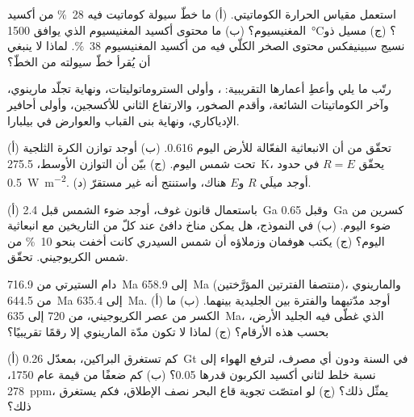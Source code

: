 \begin{exercise}[$\star$]\label{exo:b2:precambrian-earth:3}
استعمل مقياس الحرارة الكوماتيتي. (أ) ما خطّ سيولة كوماتيت فيه
\qty{28}{\percent} من أكسيد المغنيسيوم؟ (ب) ما محتوى أكسيد المغنيسيوم الذي يوافق \qty{1500}{\celsius}؟ (ج) مسيل
ذو نسيج سبينيفكس محتوى الصخر الكلّي فيه من أكسيد المغنيسيوم \qty{38}{\percent}. لماذا لا ينبغي أن يُقرأ خطّ سيولته
من الخطّ؟
\end{exercise}

\begin{exercise}[$\star$]\label{exo:b2:precambrian-earth:4}
رتّب ما يلي وأعطِ أعمارها التقريبية: ، وأولى
الستروماتوليتات، ونهاية تجلّد مارينوي، وآخر الكوماتيتات الشائعة، وأقدم
الصخور، والارتفاع الثاني للأكسجين، وأولى أحافير الإدياكاري، ونهاية بنى القباب والعوارض
في بيلبارا.
\end{exercise}

\begin{exercise}[$\star\star$]\label{exo:b2:precambrian-earth:5}
(أ) تحقّق من أن الانبعاثية الفعّالة للأرض اليوم 0.616. (ب) أوجد توازن الكرة الثلجية
تحت شمس اليوم. (ج) بيّن أن التوازن الأوسط، \qty{275.5}{K}، يحقّق
$R = E$ في حدود \qty{0.5}{W.m^{-2}}. (د) أوجد ميلَي $R$ و$E$ هناك، واستنتج
أنه غير مستقرّ.
\end{exercise}

\begin{exercise}[$\star\star$]\label{exo:b2:precambrian-earth:6}
(أ) باستعمال قانون غوف، أوجد ضوء الشمس قبل \qty{2.4}{Ga} وقبل \qty{0.65}{Ga} كسرين
من ضوء اليوم. (ب) في النموذج، هل يمكن مناخ دافئ عند كلّ من التاريخين مع انبعاثية اليوم؟
(ج) يكتب هوفمان وزملاؤه أن شمس السيدري كانت أخفت بنحو \qty{10}{\percent} من
شمس الكريوجيني. تحقّق.
\end{exercise}

\begin{exercise}[$\star\star$]\label{exo:b2:precambrian-earth:7}
دام الستيرتي من \qty{716.9}{Ma} إلى \qty{658.9}{Ma} (منتصفا الفترتين المؤرَّختين)،
والمارينوي من \qty{644.5}{Ma} إلى \qty{635.4}{Ma}. (أ) أوجد مدّتيهما والفترة
بين الجليدية بينهما. (ب) ما الكسر من عصر الكريوجيني، من 720 إلى \qty{635}{Ma}،
الذي غطّى فيه الجليد الأرض، بحسب هذه الأرقام؟ (ج) لماذا لا تكون مدّة المارينوي إلا رقمًا
تقريبيًا؟
\end{exercise}

\begin{exercise}[$\star\star$]\label{exo:b2:precambrian-earth:8}
(أ) كم تستغرق البراكين، بمعدّل \qty{0.26}{Gt} في السنة ودون أي مصرف، لترفع الهواء إلى
نسبة خلط لثاني أكسيد الكربون قدرها 0.05؟ (ب) كم ضعفًا من قيمة عام 1750، \qty{278}{ppm}، يمثّل ذلك؟ (ج) لو امتصّت تجوية قاع
البحر نصف الإطلاق، فكم يستغرق ذلك؟
\end{exercise}

